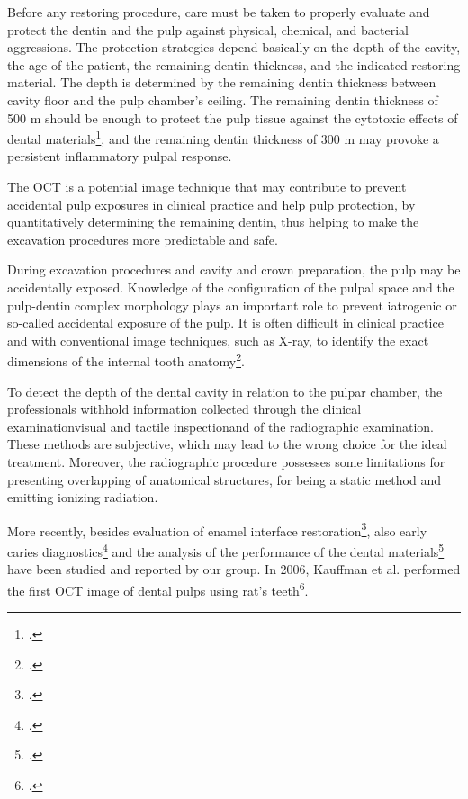 \documentclass[12pt,twoside,english]{book}
\renewcommand{\~}{\perispomeni}%
\DeclareRobustCommand{\textgreek}[1]{\leavevmode{\greektext #1}}
\numberwithin{equation}{section}
\numberwithin{figure}{section}
\begin{document}
Before any restoring procedure, care must be taken to properly evaluate and protect the dentin and the pulp against physical, chemical, and bacterial aggressions. The protection strategies depend basically on the depth of the cavity, the age of the patient, the remaining dentin thickness, and the indicated restoring material. The depth is determined by the remaining dentin thickness between cavity floor and the pulp chamber's ceiling. The remaining dentin thickness of 500 \textgreek{m}m should be enough to protect the pulp tissue against the cytotoxic effects of dental materials\footcite{Hanks:1988p2379}, and the remaining dentin thickness of 300 \textgreek{m}m may provoke a persistent inflammatory pulpal response.

The OCT is a potential image technique that may contribute to prevent accidental pulp exposures in clinical practice and help pulp protection, by quantitatively determining the remaining dentin, thus helping to make the excavation procedures more predictable and safe.

During excavation procedures and cavity and crown preparation, the pulp may be accidentally exposed. Knowledge of the configuration of the pulpal space and the pulp-dentin complex morphology plays an important role to prevent iatrogenic or so-called accidental exposure of the pulp. It is often difficult in clinical practice and with conventional image techniques, such as X-ray, to identify the exact dimensions of the internal tooth anatomy\footcite{Mjor:2002p2276}.

To detect the depth of the dental cavity in relation to the pulpar chamber, the professionals withhold information collected through the clinical examination\textemdash visual and tactile inspection\textemdash and of the radiographic examination. These methods are subjective, which may lead to the wrong choice for the ideal treatment. Moreover, the radiographic procedure possesses some limitations for presenting overlapping of anatomical structures, for being a static method and emitting ionizing radiation.

More recently, besides evaluation of enamel interface restoration\footcite{DeMelo:2005p2100}, also early caries diagnostics\footcite{Freitas:2009p2142} and the analysis of the performance of the dental materials\footcite{Kyotoku:2007p788,Braz:2009p2143} have been studied and reported by our group. In 2006, Kauffman et al. performed the first OCT image of dental pulps using rat's teeth\footcite{Kauffman:2006p2144}.
\end{document}
